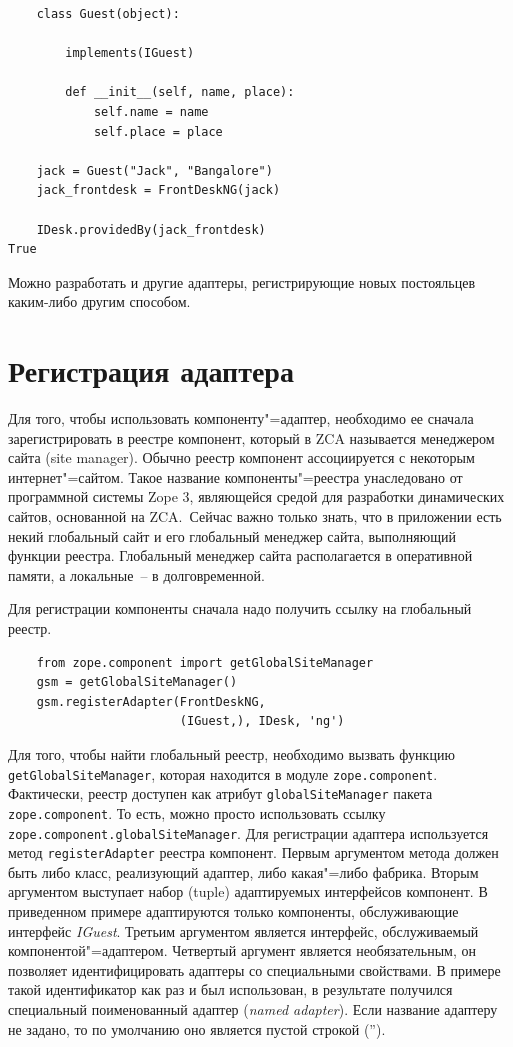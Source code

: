 \documentclass[a4paper,openany,twoside,final]{book}
\providecommand*{\DUroletitlereference}[1]{\textsl{#1}}
\begin{document}
\begin{verbatim}
    class Guest(object):

        implements(IGuest)

        def __init__(self, name, place):
            self.name = name
            self.place = place

    jack = Guest("Jack", "Bangalore")
    jack_frontdesk = FrontDeskNG(jack)

    IDesk.providedBy(jack_frontdesk)
True
\end{verbatim}

Можно разработать и другие адаптеры, регистрирующие новых
постояльцев каким-либо другим способом.


\section{Регистрация адаптера%
  \label{id35}%
}

Для того, чтобы использовать компоненту"=адаптер, необходимо ее сначала зарегистрировать в реестре компонент, который в ZCA называется менеджером сайта (site manager).  Обычно реестр компонент ассоциируется с некоторым интернет"=сайтом.  Такое название компоненты"=реестра унаследовано от программной системы Zope 3, являющейся средой для разработки динамических сайтов, основанной на ZCA.~Сейчас важно только знать, что в приложении есть некий глобальный сайт и его глобальный менеджер сайта, выполняющий функции реестра.  Глобальный менеджер сайта располагается в оперативной памяти, а локальные~-- в долговременной.

Для регистрации компоненты сначала надо получить ссылку на глобальный реестр.

\begin{verbatim}
    from zope.component import getGlobalSiteManager
    gsm = getGlobalSiteManager()
    gsm.registerAdapter(FrontDeskNG,
                        (IGuest,), IDesk, 'ng')
\end{verbatim}

Для того, чтобы найти глобальный реестр, необходимо вызвать функцию \texttt{getGlobalSiteManager}, которая находится в модуле \texttt{zope.component}.  Фактически, реестр доступен как атрибут \texttt{globalSiteManager} пакета \texttt{zope.component}.  То есть, можно просто использовать ссылку \texttt{zope.component.globalSiteManager}.  Для регистрации адаптера используется метод \texttt{registerAdapter} реестра компонент.  Первым аргументом метода должен быть либо класс, реализующий адаптер, либо какая"=либо фабрика.  Вторым аргументом выступает набор (tuple) адаптируемых интерфейсов компонент.  В приведенном примере адаптируются только компоненты, обслуживающие интерфейс \DUroletitlereference{IGuest}.  Третьим аргументом является интерфейс, обслуживаемый компонентой"=адаптером.  Четвертый аргумент является необязательным, он позволяет идентифицировать адаптеры со специальными свойствами.  В примере такой идентификатор как раз и был использован, в результате получился специальный поименованный адаптер (\DUroletitlereference{named adapter}).  Если название адаптеру не задано, то по умолчанию оно является пустой строкой ('').
\end{document}
